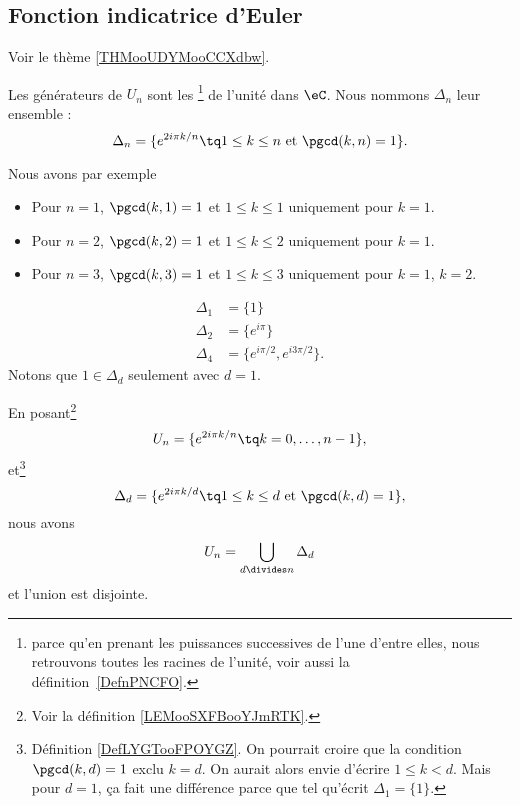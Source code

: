 \subsection{Fonction indicatrice d'Euler}

Voir le thème \ref{THMooUDYMooCCXdbw}.

\begin{definition}\label{DefLYGTooFPOYGZ}
	Les générateurs de \( U_n\) sont les \footnote{parce qu'en prenant les puissances successives de l'une d'entre elles, nous retrouvons toutes les racines de l'unité, voir aussi la définition~\ref{DefnPNCFO}.} de l'unité dans \( \eC\). Nous nommons \( \Delta_n\) leur ensemble :
	\begin{equation}
		\Delta_n=\{  e^{2i\pi k/n}\tq 1\leq k\leq n \text{ et } \pgcd(k,n)=1 \}.
	\end{equation}
\end{definition}
Nous avons par exemple

\begin{itemize}
	\item Pour \( n=1\), \( \pgcd(k,1)=1\) et \( 1\leq k\leq 1\) uniquement pour \( k=1\).
	\item Pour \( n=2\), \( \pgcd(k,2)=1\) et \( 1\leq k\leq 2\) uniquement pour \( k=1\).
	\item Pour \( n=3\), \( \pgcd(k,3)=1\) et \( 1\leq k\leq 3\) uniquement pour \( k=1\), \( k=2\).
\end{itemize}

\begin{subequations}
	\begin{align}
		\Delta_1 & =\{ 1 \}                           \\
		\Delta_2 & =\{ e^{i\pi } \}                   \\
		\Delta_4 & =\{ e^{i\pi /2}, e^{i 3\pi /2} \}.
	\end{align}
\end{subequations}
Notons que \( 1\in \Delta_d\) seulement avec \( d=1\).


\begin{proposition}		\label{PROPooWILSooFHWLnt}
	En posant\footnote{Voir la définition \ref{LEMooSXFBooYJmRTK}.}
	\begin{equation}
		U_n=\{ e^{2i\pi k/n}  \tq k=0,\ldots, n-1 \},
	\end{equation}
	et\footnote{Définition \ref{DefLYGTooFPOYGZ}. On pourrait croire que la condition \( \pgcd(k,d)=1\) exclu \( k=d\). On aurait alors envie d'écrire \( 1\leq k<d\). Mais pour \( d=1\), ça fait une différence parce que tel qu'écrit \( \Delta_1=\{ 1 \}\).}
	\begin{equation}
		\Delta_d=\{  e^{2i\pi k/d}\tq 1\leq k\leq d \text{ et } \pgcd(k,d)=1 \},
	\end{equation}
	nous avons
	\begin{equation}        \label{EqpZuIyL}
		U_n=\bigcup_{d\divides n}\Delta_d
	\end{equation}
	et l'union est disjointe.
\end{proposition}

